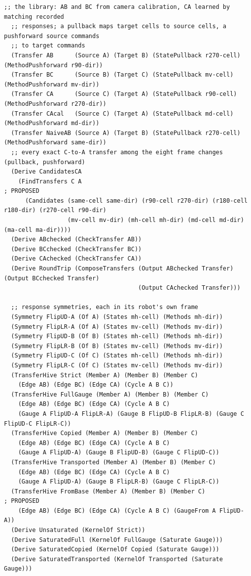 \documentclass[11pt]{article}
\theoremstyle{definition}
\theoremstyle{plain}
\begin{document}
\begin{lstlisting}[style=mettafull]
  ;; the library: AB and BC from camera calibration, CA learned by matching recorded
  ;; responses; a pullback maps target cells to source cells, a pushforward source commands
  ;; to target commands
  (Transfer AB      (Source A) (Target B) (StatePullback r270-cell) (MethodPushforward r90-dir))
  (Transfer BC      (Source B) (Target C) (StatePullback mv-cell)   (MethodPushforward mv-dir))
  (Transfer CA      (Source C) (Target A) (StatePullback r90-cell)  (MethodPushforward r270-dir))
  (Transfer CAcal   (Source C) (Target A) (StatePullback md-cell)   (MethodPushforward md-dir))
  (Transfer NaiveAB (Source A) (Target B) (StatePullback r270-cell) (MethodPushforward same-dir))
  ;; every exact C-to-A transfer among the eight frame changes (pullback, pushforward)
  (Derive CandidatesCA
    (FindTransfers C A                                                                  ; PROPOSED
      (Candidates (same-cell same-dir) (r90-cell r270-dir) (r180-cell r180-dir) (r270-cell r90-dir)
                  (mv-cell mv-dir) (mh-cell mh-dir) (md-cell md-dir) (ma-cell ma-dir))))
  (Derive ABchecked (CheckTransfer AB))
  (Derive BCchecked (CheckTransfer BC))
  (Derive CAchecked (CheckTransfer CA))
  (Derive RoundTrip (ComposeTransfers (Output ABchecked Transfer) (Output BCchecked Transfer)
                                      (Output CAchecked Transfer)))

  ;; response symmetries, each in its robot's own frame
  (Symmetry FlipUD-A (Of A) (States mh-cell) (Methods mh-dir))
  (Symmetry FlipLR-A (Of A) (States mv-cell) (Methods mv-dir))
  (Symmetry FlipUD-B (Of B) (States mh-cell) (Methods mh-dir))
  (Symmetry FlipLR-B (Of B) (States mv-cell) (Methods mv-dir))
  (Symmetry FlipUD-C (Of C) (States mh-cell) (Methods mh-dir))
  (Symmetry FlipLR-C (Of C) (States mv-cell) (Methods mv-dir))
  (TransferHive Strict (Member A) (Member B) (Member C)
    (Edge AB) (Edge BC) (Edge CA) (Cycle A B C))
  (TransferHive FullGauge (Member A) (Member B) (Member C)
    (Edge AB) (Edge BC) (Edge CA) (Cycle A B C)
    (Gauge A FlipUD-A FlipLR-A) (Gauge B FlipUD-B FlipLR-B) (Gauge C FlipUD-C FlipLR-C))
  (TransferHive Copied (Member A) (Member B) (Member C)
    (Edge AB) (Edge BC) (Edge CA) (Cycle A B C)
    (Gauge A FlipUD-A) (Gauge B FlipUD-B) (Gauge C FlipUD-C))
  (TransferHive Transported (Member A) (Member B) (Member C)
    (Edge AB) (Edge BC) (Edge CA) (Cycle A B C)
    (Gauge A FlipUD-A) (Gauge B FlipLR-B) (Gauge C FlipLR-C))
  (TransferHive FromBase (Member A) (Member B) (Member C)                             ; PROPOSED
    (Edge AB) (Edge BC) (Edge CA) (Cycle A B C) (GaugeFrom A FlipUD-A))
  (Derive Unsaturated (KernelOf Strict))
  (Derive SaturatedFull (KernelOf FullGauge (Saturate Gauge)))
  (Derive SaturatedCopied (KernelOf Copied (Saturate Gauge)))
  (Derive SaturatedTransported (KernelOf Transported (Saturate Gauge)))


\end{lstlisting}
\end{document}
